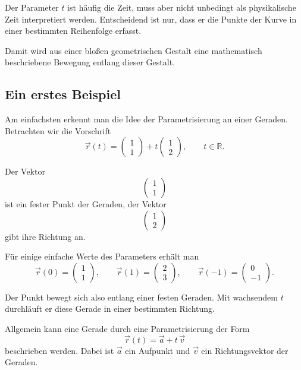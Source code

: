 Der Parameter \(t\) ist häufig die Zeit,
muss aber nicht unbedingt als physikalische Zeit interpretiert werden.
Entscheidend ist nur,
dass er die Punkte der Kurve in einer bestimmten Reihenfolge erfasst.

Damit wird aus einer bloßen geometrischen Gestalt
eine mathematisch beschriebene Bewegung entlang dieser Gestalt.


\subsection{Ein erstes Beispiel}

Am einfachsten erkennt man die Idee der Parametrisierung an einer Geraden.
Betrachten wir die Vorschrift
\[
\vec r(t)=
\begin{pmatrix}
	1\\
	1
\end{pmatrix}
+t
\begin{pmatrix}
	1\\
	2
\end{pmatrix},
\qquad t\in\mathbb R.
\]

Der Vektor
\[
\begin{pmatrix}
	1\\
	1
\end{pmatrix}
\]
ist ein fester Punkt der Geraden,
der Vektor
\[
\begin{pmatrix}
	1\\
	2
\end{pmatrix}
\]
gibt ihre Richtung an.

Für einige einfache Werte des Parameters erhält man
\[
\vec r(0)=
\begin{pmatrix}
	1\\
	1
\end{pmatrix},
\qquad
\vec r(1)=
\begin{pmatrix}
	2\\
	3
\end{pmatrix},
\qquad
\vec r(-1)=
\begin{pmatrix}
	0\\
	-1
\end{pmatrix}.
\]

Der Punkt bewegt sich also entlang einer festen Geraden.
Mit wachsendem \(t\) durchläuft er diese Gerade in einer bestimmten Richtung.

Allgemein kann eine Gerade durch eine Parametrisierung der Form
\[
\vec r(t)=\vec a+t\,\vec v
\]
beschrieben werden.
Dabei ist \(\vec a\) ein Aufpunkt und \(\vec v\) ein Richtungsvektor der Geraden.


